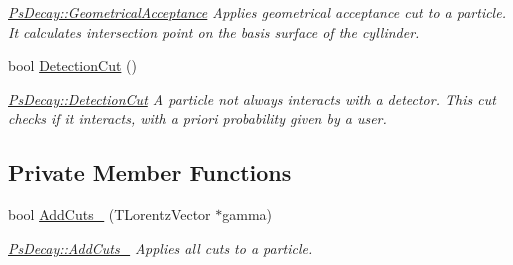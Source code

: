 \begin{DoxyCompactItemize}
\begin{DoxyCompactList}\small\item\em \hyperlink{classPsDecay_a3988e06145dee5f112aee8b256b4cab8}{Ps\+Decay\+::\+Geometrical\+Acceptance} Applies geometrical acceptance cut to a particle. It calculates intersection point on the basis surface of the cyllinder. \end{DoxyCompactList}\item 
bool \hyperlink{classPsDecay_a98329cfeebbca0017123fd7928de1cfe}{Detection\+Cut} ()
\begin{DoxyCompactList}\small\item\em \hyperlink{classPsDecay_a98329cfeebbca0017123fd7928de1cfe}{Ps\+Decay\+::\+Detection\+Cut} A particle not always interacts with a detector. This cut checks if it interacts, with a priori probability given by a user. \end{DoxyCompactList}\end{DoxyCompactItemize}
\subsection*{Private Member Functions}
\begin{DoxyCompactItemize}
\item 
bool \hyperlink{classPsDecay_aa0df6edea1fa6961cbf5307a2c975e3b}{Add\+Cuts\+\_\+} (T\+Lorentz\+Vector $\ast$gamma)
\begin{DoxyCompactList}\small\item\em \hyperlink{classPsDecay_aa0df6edea1fa6961cbf5307a2c975e3b}{Ps\+Decay\+::\+Add\+Cuts\+\_\+} Applies all cuts to a particle. \end{DoxyCompactList}\end{DoxyCompactItemize}

